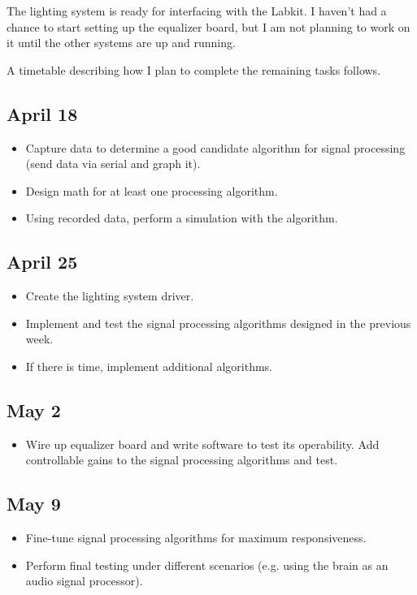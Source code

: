 \documentclass[letterpaper,10pt,notitlepage]{report}
\begin{document}
    The lighting system is ready for interfacing with the Labkit.  I haven't 
    had a chance to start setting up the equalizer board, but I am not 
    planning to work on it until the other systems are up and running.

    A timetable describing how I plan to complete the remaining tasks follows.

    \subsection{April 18}
        \begin{itemize}
            \item Capture data to determine a good candidate algorithm for 
                  signal processing (send data via serial and graph it).
            \item Design math for at least one processing algorithm.
            \item Using recorded data, perform a simulation with the algorithm.
        \end{itemize}

    \subsection{April 25}
        \begin{itemize}
            \item Create the lighting system driver.
            \item Implement and test the signal processing algorithms designed 
                  in the previous week.
            \item If there is time, implement additional algorithms.
        \end{itemize}

    \subsection{May 2}
        \begin{itemize}
            \item Wire up equalizer board and write software to test its operability.
            \jtem Add controllable gains to the signal processing algorithms 
                  and test.
        \end{itemize}

    \subsection{May 9}
        \begin{itemize}
            \item Fine-tune signal processing algorithms for maximum 
                  responsiveness.
            \item Perform final testing under different scenarios (e.g. using 
                  the brain as an audio signal processor).
        \end{itemize}
\end{document}
